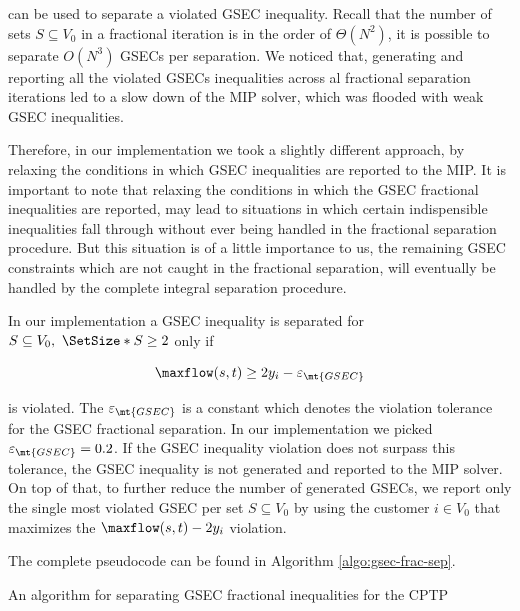 can be used to separate a violated GSEC inequality.
Recall that the number of sets $S \subseteq V_0$ in a fractional iteration is in the order of $\Theta(N^2)$, it is possible to separate $O(N^3)$ GSECs per separation.
We noticed that, generating and reporting all the violated GSECs inequalities across al fractional separation iterations led to a slow down of the MIP solver, which was flooded with weak GSEC inequalities.

Therefore, in our implementation we took a slightly different approach, by relaxing the conditions in which GSEC inequalities are reported to the MIP.
It is important to note that relaxing the conditions in which the GSEC fractional inequalities are reported, may lead to situations in which certain indispensible inequalities fall through without ever being handled in the fractional separation procedure.
But this situation is of a little importance to us, the remaining GSEC constraints which are not caught in the fractional separation, will eventually be handled by the complete integral separation procedure.

In our implementation a GSEC inequality is separated for $S \subseteq V_0,\ \SetSize*{S} \ge 2$ only if

\begin{equation}
	\maxflow(s, t) \ge 2 y_i - \varepsilon_{\mt{GSEC}}
\end{equation}

is violated.
The $\varepsilon_{\mt{GSEC}}$ is a constant which denotes the violation tolerance for the GSEC fractional separation.
In our implementation we picked $\varepsilon_{\mt{GSEC}} = 0.2$.
If the GSEC inequality violation does not surpass this tolerance, the GSEC inequality is not generated and reported to the MIP solver.
On top of that, to further reduce the number of generated GSECs, we report only the single most violated GSEC per set $S \subseteq V_0$ by using the customer $i \in V_0$ that maximizes the $\maxflow(s, t) - 2 y_i$ violation.

The complete pseudocode can be found in Algorithm \ref{algo:gsec-frac-sep}.

\begin{algorithm}
	\caption{An algorithm for separating GSEC fractional inequalities for the CPTP}
	\label{algo:gsec-frac-sep}
	
\end{algorithm}

